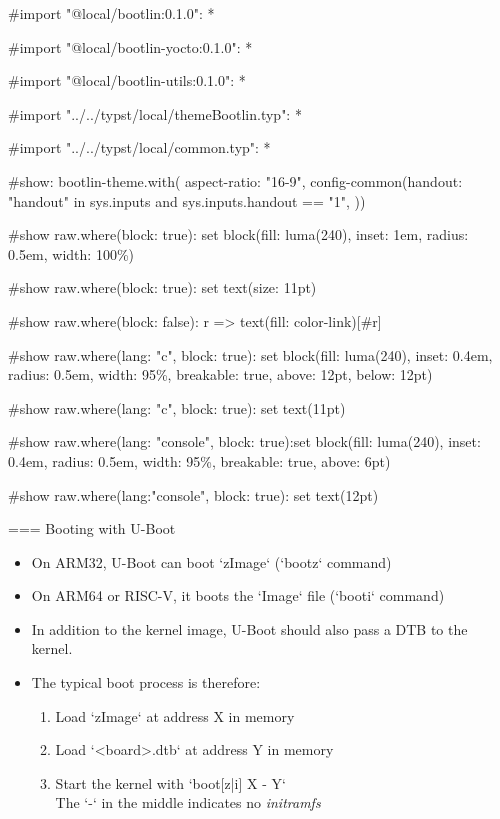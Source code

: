 #import "@local/bootlin:0.1.0": *

#import "@local/bootlin-yocto:0.1.0": *

#import "@local/bootlin-utils:0.1.0": *

#import "../../typst/local/themeBootlin.typ": *

#import "../../typst/local/common.typ": *

#show: bootlin-theme.with( aspect-ratio: "16-9", config-common(handout: "handout" in sys.inputs and sys.inputs.handout == "1", ))

#show raw.where(block: true): set block(fill: luma(240), inset: 1em, radius: 0.5em, width: 100\%)

#show raw.where(block: true): set text(size: 11pt)

#show raw.where(block: false): r => text(fill: color-link)[#r]

#show raw.where(lang: "c", block: true): set block(fill: luma(240), inset: 0.4em, radius: 0.5em, width: 95\%, breakable: true, above: 12pt, below: 12pt)

#show raw.where(lang: "c", block: true): set text(11pt)

#show raw.where(lang: "console", block: true):set block(fill: luma(240), inset: 0.4em, radius: 0.5em, width: 95\%, breakable: true, above: 6pt)

#show raw.where(lang:"console", block: true): set text(12pt)

=== Booting with U-Boot
  \begin{itemize}
  \item On ARM32, U-Boot can boot `zImage` (`bootz` command)
  \item On ARM64 or RISC-V, it boots the `Image` file (`booti` command)
  \item In addition to the kernel image, U-Boot should also pass a
        DTB to the kernel.
  \item The typical boot process is therefore:
    \begin{enumerate}
    \item Load `zImage` at address X in memory
    \item Load `<board>.dtb` at address Y in memory
    \item Start the kernel with `boot[z|i] X - Y` \\
      The `-` in the middle indicates no {\em initramfs}
    \end{enumerate}
  \end{itemize}


